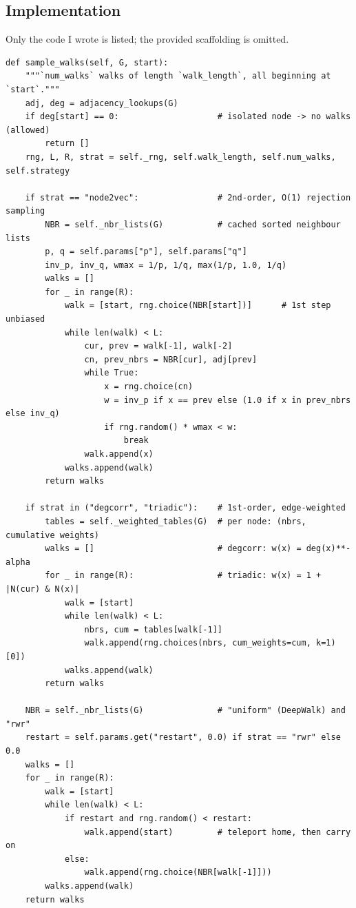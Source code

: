 \subsection{Implementation}
\label{p1:sec:code}

Only the code I wrote is listed; the provided scaffolding is omitted.


\begin{lstlisting}[caption={TODO 1 --- \texttt{sample\_walks}},captionpos=b]
def sample_walks(self, G, start):
    """`num_walks` walks of length `walk_length`, all beginning at `start`."""
    adj, deg = adjacency_lookups(G)
    if deg[start] == 0:                    # isolated node -> no walks (allowed)
        return []
    rng, L, R, strat = self._rng, self.walk_length, self.num_walks, self.strategy

    if strat == "node2vec":                # 2nd-order, O(1) rejection sampling
        NBR = self._nbr_lists(G)           # cached sorted neighbour lists
        p, q = self.params["p"], self.params["q"]
        inv_p, inv_q, wmax = 1/p, 1/q, max(1/p, 1.0, 1/q)
        walks = []
        for _ in range(R):
            walk = [start, rng.choice(NBR[start])]      # 1st step unbiased
            while len(walk) < L:
                cur, prev = walk[-1], walk[-2]
                cn, prev_nbrs = NBR[cur], adj[prev]
                while True:
                    x = rng.choice(cn)
                    w = inv_p if x == prev else (1.0 if x in prev_nbrs else inv_q)
                    if rng.random() * wmax < w:
                        break
                walk.append(x)
            walks.append(walk)
        return walks

    if strat in ("degcorr", "triadic"):    # 1st-order, edge-weighted
        tables = self._weighted_tables(G)  # per node: (nbrs, cumulative weights)
        walks = []                         # degcorr: w(x) = deg(x)**-alpha
        for _ in range(R):                 # triadic: w(x) = 1 + |N(cur) & N(x)|
            walk = [start]
            while len(walk) < L:
                nbrs, cum = tables[walk[-1]]
                walk.append(rng.choices(nbrs, cum_weights=cum, k=1)[0])
            walks.append(walk)
        return walks

    NBR = self._nbr_lists(G)               # "uniform" (DeepWalk) and "rwr"
    restart = self.params.get("restart", 0.0) if strat == "rwr" else 0.0
    walks = []
    for _ in range(R):
        walk = [start]
        while len(walk) < L:
            if restart and rng.random() < restart:
                walk.append(start)         # teleport home, then carry on
            else:
                walk.append(rng.choice(NBR[walk[-1]]))
        walks.append(walk)
    return walks
\end{lstlisting}

